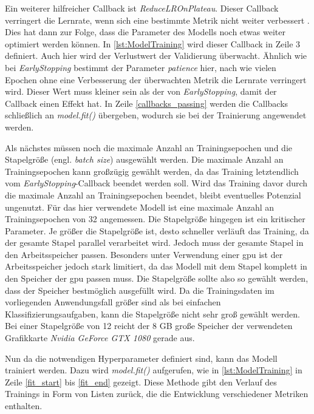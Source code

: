 Ein weiterer hilfreicher Callback ist \emph{ReduceLROnPlateau}.
Dieser Callback verringert die Lernrate, wenn sich eine bestimmte Metrik nicht weiter verbessert \cite{KerasReduceLROnPlateau}.
Dies hat dann zur Folge, dass die Parameter des Modells noch etwas weiter optimiert werden können.
In \autoref{lst:ModelTraining} wird dieser Callback in Zeile 3 definiert.
Auch hier wird der Verlustwert der Validierung überwacht.
Ähnlich wie bei \emph{EarlyStopping} bestimmt der Parameter \emph{patience} hier, nach wie vielen Epochen ohne eine Verbesserung der überwachten Metrik die Lernrate verringert wird.
Dieser Wert muss kleiner sein als der von \emph{EarlyStopping}, damit der Callback einen Effekt hat.
In Zeile \ref{callbacks_passing} werden die Callbacks schließlich an \emph{model.fit()} übergeben, wodurch sie bei der Trainierung angewendet werden.

Als nächstes müssen noch die maximale Anzahl an Trainingsepochen und die Stapelgröße (engl. \emph{batch size}) ausgewählt werden.
Die maximale Anzahl an Trainingsepochen kann großzügig gewählt werden, da das Training letztendlich vom \emph{EarlyStopping}-Callback beendet werden soll.
Wird das Training davor durch die maximale Anzahl an Trainingsepochen beendet, bleibt eventuelles Potenzial ungenutzt.
Für das hier verwendete Modell ist eine maximale Anzahl an Trainingsepochen von 32 angemessen.
Die Stapelgröße hingegen ist ein kritischer Parameter.
Je größer die Stapelgröße ist, desto schneller verläuft das Training, da der gesamte Stapel parallel verarbeitet wird.
Jedoch muss der gesamte Stapel in den Arbeitsspeicher passen.
Besonders unter Verwendung einer \acrshort{gpu} ist der Arbeitsspeicher jedoch stark limitiert, da das Modell mit dem Stapel komplett in den Speicher der \acrshort{gpu} passen muss.
Die Stapelgröße sollte also so gewählt werden, dass der Speicher bestmöglich ausgefüllt wird.
Da die Trainingsdaten im vorliegenden Anwendungsfall größer sind als bei einfachen Klassifizierungsaufgaben, kann die Stapelgröße nicht sehr groß gewählt werden.
Bei einer Stapelgröße von 12 reicht der 8 GB große Speicher der verwendeten Grafikkarte \emph{Nvidia GeForce GTX 1080} gerade aus.

Nun da die notwendigen Hyperparameter definiert sind, kann das Modell trainiert werden.
Dazu wird \emph{model.fit()} aufgerufen, wie in \autoref{lst:ModelTraining} in Zeile \ref{fit_start} bis \ref{fit_end} gezeigt.
Diese Methode gibt den Verlauf des Trainings in Form von Listen zurück, die die Entwicklung verschiedener Metriken enthalten.

